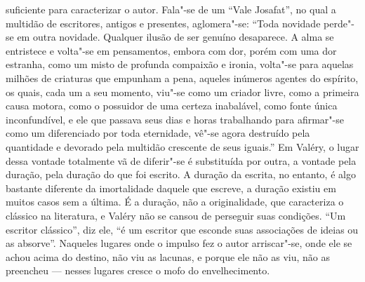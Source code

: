 suficiente para caracterizar o autor. Fala"-se de um ``Vale Josafat'', no
qual a multidão de escritores, antigos e presentes, aglomera"-se: ``Toda novidade
perde"-se em outra novidade. Qualquer ilusão de ser genuíno
desaparece. A alma se entristece e volta"-se em pensamentos, embora com
dor, porém com uma dor estranha, como um misto de profunda compaixão e ironia,
volta"-se para aquelas milhões de criaturas que empunham a pena, aqueles
inúmeros agentes do espírito, os quais, cada um a seu momento, viu"-se
como um criador livre, como a primeira causa motora, como o possuidor
de uma certeza inabalável, como fonte única inconfundível, e ele que
passava seus dias e horas trabalhando para afirmar"-se como
um diferenciado por toda eternidade, vê"-se agora destruído
pela quantidade e devorado pela multidão crescente de seus iguais.'' Em
Valéry, o lugar dessa vontade totalmente vã de diferir"-se é substituída
por outra, a vontade pela duração, pela duração do que foi escrito. A
duração da escrita, no entanto, é algo bastante diferente da
imortalidade daquele que escreve, a duração existiu em muitos casos sem
a última. É a duração, não a originalidade, que caracteriza o clássico
na literatura, e Valéry não se cansou de perseguir suas condições. ``Um
escritor clássico'', diz ele, ``é um escritor que esconde suas associações
de ideias ou as absorve''. Naqueles lugares onde o impulso fez o autor
arriscar"-se, onde ele se achou acima do destino, não viu as lacunas, e
porque ele não as viu, não as preencheu --- nesses lugares cresce o mofo
do envelhecimento.

